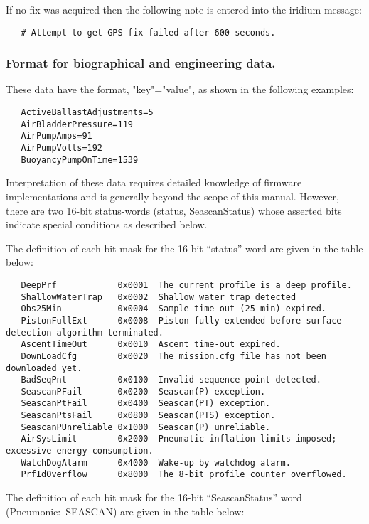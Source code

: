    If no fix was acquired then the following note is entered into the
   iridium message:

   \begin{verbatim}
   # Attempt to get GPS fix failed after 600 seconds.
   \end{verbatim}

\subsubsection{Format for biographical and engineering data.}

   These data have the format, "key"="value", as shown in the following
   examples:

   \begin{verbatim}
   ActiveBallastAdjustments=5
   AirBladderPressure=119
   AirPumpAmps=91
   AirPumpVolts=192
   BuoyancyPumpOnTime=1539
   \end{verbatim}
    
   Interpretation of these data requires detailed knowledge of firmware
   implementations and is generally beyond the scope of this manual.
   However, there are two 16-bit status-words (status, SeascanStatus) whose
   asserted bits indicate special conditions as described below.

   The definition of each bit mask for the 16-bit ``status'' word are given in
   the table below:

   \label{StatusBitMasks}
   \begin{verbatim}
   DeepPrf            0x0001  The current profile is a deep profile.
   ShallowWaterTrap   0x0002  Shallow water trap detected
   Obs25Min           0x0004  Sample time-out (25 min) expired.
   PistonFullExt      0x0008  Piston fully extended before surface-detection algorithm terminated.
   AscentTimeOut      0x0010  Ascent time-out expired.
   DownLoadCfg        0x0020  The mission.cfg file has not been downloaded yet.
   BadSeqPnt          0x0100  Invalid sequence point detected.
   SeascanPFail       0x0200  Seascan(P) exception. 
   SeascanPtFail      0x0400  Seascan(PT) exception. 
   SeascanPtsFail     0x0800  Seascan(PTS) exception.
   SeascanPUnreliable 0x1000  Seascan(P) unreliable.
   AirSysLimit        0x2000  Pneumatic inflation limits imposed; excessive energy consumption.
   WatchDogAlarm      0x4000  Wake-up by watchdog alarm.
   PrfIdOverflow      0x8000  The 8-bit profile counter overflowed.
   \end{verbatim} 


The definition of each bit mask for the 16-bit ``SeascanStatus'' word
(Pneumonic:~SEASCAN) are given in the table below:

